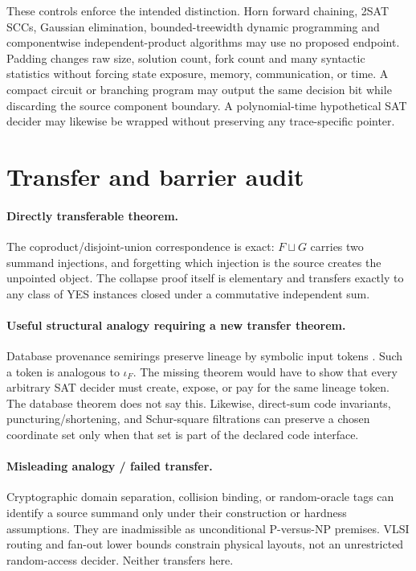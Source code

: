 \documentclass[11pt]{article}
\begin{document}
These controls enforce the intended distinction.  Horn forward chaining,
2SAT SCCs, Gaussian elimination, bounded-treewidth dynamic programming and
componentwise independent-product algorithms may use no proposed endpoint.
Padding changes raw size, solution count, fork count and many syntactic
statistics without forcing state exposure, memory, communication, or time.
A compact circuit or branching program may output the same decision bit while
discarding the source component boundary.  A polynomial-time hypothetical
SAT decider may likewise be wrapped without preserving any trace-specific
pointer.

\section{Transfer and barrier audit}

\paragraph{Directly transferable theorem.}
The coproduct/disjoint-union correspondence is exact: \(F\sqcup G\) carries
two summand injections, and forgetting which injection is the source creates
the unpointed object.  The collapse proof itself is elementary and transfers
exactly to any class of YES instances closed under a commutative independent
sum.

\paragraph{Useful structural analogy requiring a new transfer theorem.}
Database provenance semirings preserve lineage by symbolic input tokens
\cite{GKT07}.  Such a token is analogous to \(\iota_F\).  The missing theorem
would have to show that every arbitrary SAT decider must create, expose, or
pay for the same lineage token.  The database theorem does not say this.
Likewise, direct-sum code invariants, puncturing/shortening, and Schur-square
filtrations can preserve a chosen coordinate set only when that set is part of
the declared code interface.

\paragraph{Misleading analogy / failed transfer.}
Cryptographic domain separation, collision binding, or random-oracle tags can
identify a source summand only under their construction or hardness
assumptions.  They are inadmissible as unconditional P-versus-NP premises.
VLSI routing and fan-out lower bounds constrain physical layouts, not an
unrestricted random-access decider.  Neither transfers here.
\end{document}
